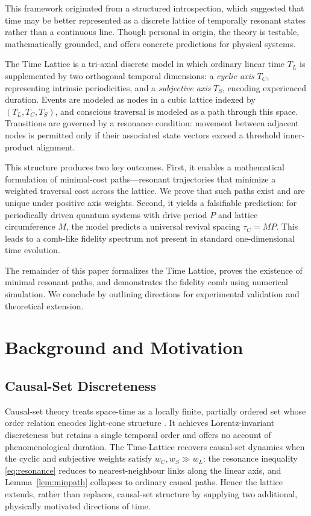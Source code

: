 \documentclass[11pt]{article}
\begin{document}
This framework originated from a structured introspection, which suggested that time may be better represented as a discrete lattice of temporally resonant states rather than a continuous line. Though personal in origin, the theory is testable, mathematically grounded, and offers concrete predictions for physical systems.

The Time Lattice is a tri-axial discrete model in which ordinary linear time \( T_L \) is supplemented by two orthogonal temporal dimensions: a \textit{cyclic axis} \( T_C \), representing intrinsic periodicities, and a \textit{subjective axis} \( T_S \), encoding experienced duration. Events are modeled as nodes in a cubic lattice indexed by \((T_L, T_C, T_S)\), and conscious traversal is modeled as a path through this space. Transitions are governed by a resonance condition: movement between adjacent nodes is permitted only if their associated state vectors exceed a threshold inner-product alignment.

This structure produces two key outcomes. First, it enables a mathematical formulation of minimal-cost paths—resonant trajectories that minimize a weighted traversal cost across the lattice. We prove that such paths exist and are unique under positive axis weights. Second, it yields a falsifiable prediction: for periodically driven quantum systems with drive period \(P\) and lattice circumference \(M\), the model predicts a universal revival spacing \(\tau_C = MP\). This leads to a comb-like fidelity spectrum not present in standard one-dimensional time evolution.

The remainder of this paper formalizes the Time Lattice, proves the existence of minimal resonant paths, and demonstrates the fidelity comb using numerical simulation. We conclude by outlining directions for experimental validation and theoretical extension.

\section{Background and Motivation}
\subsection{Causal-Set Discreteness}
Causal-set theory treats space-time as a locally finite, partially ordered
set whose order relation encodes light-cone structure
\cite{Bombelli1987,Henson2009}.  It achieves Lorentz-invariant
discreteness but retains a single temporal order and offers no account of
phenomenological duration.  The Time-Lattice recovers causal-set dynamics
when the cyclic and subjective weights satisfy $w_C,w_S\!\gg\!w_L$:
the resonance inequality \eqref{eq:resonance} reduces to nearest-neighbour
links along the linear axis, and Lemma~\ref{lem:minpath} collapses to
ordinary causal paths.  Hence the lattice extends, rather than replaces,
causal-set structure by supplying two additional, physically motivated
directions of time.
\end{document}
